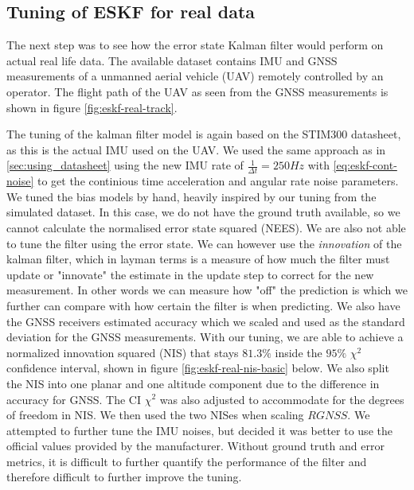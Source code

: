 \subsection{Tuning of ESKF for real data} \label{a2task3}
The next step was to see how the error state Kalman filter would perform on actual real life data. The available dataset contains IMU and GNSS measurements of a unmanned aerial vehicle (UAV) remotely controlled by an operator. The flight path of the UAV as seen from the GNSS measurements is shown in figure \ref{fig:eskf-real-track}.

The tuning of the kalman filter model is again based on the STIM300 datasheet, as this is the actual IMU used on the UAV. We used the same approach as in \cref{sec:using_datasheet} using the new IMU rate of $\frac{1}{\Delta t} = 250Hz$ with \cref{eq:eskf-cont-noise} to get the continious time acceleration and angular rate noise parameters. We tuned the bias models by hand, heavily inspired by our tuning from the simulated dataset. In this case, we do not have the ground truth available, so we cannot calculate the normalised error state squared (NEES). We are also not able to tune the filter using the error state. We can however use the \textit{innovation} of the kalman filter, which in layman terms is a measure of how much the filter must update or "innovate" the estimate in the update step to correct for the new measurement. In other words we can measure how "off" the prediction is which we further can compare with how certain the filter is when predicting. We also have the GNSS receivers estimated accuracy which we scaled and used as the standard deviation for the GNSS measurements. With our tuning, we are able to achieve a normalized innovation squared (NIS) that stays $81.3\%$ inside the $95\%$ $\chi^2$ confidence interval, shown in figure \ref{fig:eskf-real-nis-basic} below. We also split the NIS into one planar and one altitude component due to the difference in accuracy for GNSS. The CI $\chi^2$ was also adjusted to accommodate for the degrees of freedom in NIS. We then used the two NISes when scaling $RGNSS$. We attempted to further tune the IMU noises, but decided it was better to use the official values provided by the manufacturer. Without ground truth and error metrics, it is difficult to further quantify the performance of the filter and therefore difficult to further improve the tuning. 



